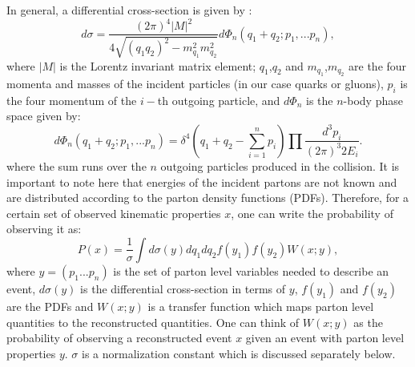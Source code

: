 \documentclass{cmspaper}
\begin{document}
In general, a differential cross-section is given by \cite{ref:PDG}:
\begin{equation}
d\sigma=\frac{(2\pi)^{4} \left| M \right|^{2}}{4\sqrt{(q_{1}q_{2})^{2}-m_{q_{1}}^{2}m_{q_{2}}^{2}}}d\Phi_{n}(q_{1}+q_{2};p_{1},...p_{n}),
\label{eqn:DiffXsecGeneral}  
\end{equation}
where $\left| M \right|$ is the Lorentz invariant matrix element;
$q_{1}$,$q_{2}$ and $m_{q_{1}}$,$m_{q_{2}}$ are the four momenta and masses of the incident particles 
(in our case quarks or gluons), 
$p_i$ is the four momentum of the $i-$th outgoing particle, 
and $d\Phi_{n}$ is the $n$-body phase space given by:
\begin{equation}
d\Phi_{n}(q_{1}+q_{2};p_{1},...p_{n})=\delta^{4}(q_{1}+q_{2}-\sum_{i=1}^{n}{p_{i}})\prod\frac{d^{3}p_{i}}{(2\pi)^{3}2E_{i}}.
\label{eqn:PhaseSpaceGeneral}  
\end{equation}
where the sum runs over the $n$ outgoing particles produced in the collision.
It is important to note here that energies of the incident partons are not known and are distributed according to the parton density 
functions (PDFs). Therefore, for a certain set of observed kinematic properties $x$, one can write the probability of observing it as:
\begin{equation}
P(x)=\frac{1}{\sigma}\int d\sigma(y)dq_{1}dq_{2}f(y_{1})f(y_{2})W(x;y),
\label{eqn:EvtProbGeneral}  
\end{equation}
where $y=(p_{1}...p_{n})$ is the set of parton level variables needed to describe an event, $d\sigma(y)$ is the differential cross-section 
in terms of $y$, $f(y_{1})$ and $f(y_{2})$ are the PDFs and $W(x;y)$ is a transfer function which maps parton level quantities to the 
reconstructed quantities.  One can think of $W(x;y)$ as the probability of observing a reconstructed event $x$ given an event with parton level properties $y$. $\sigma$ is a normalization constant which is discussed separately below.
\end{document}
